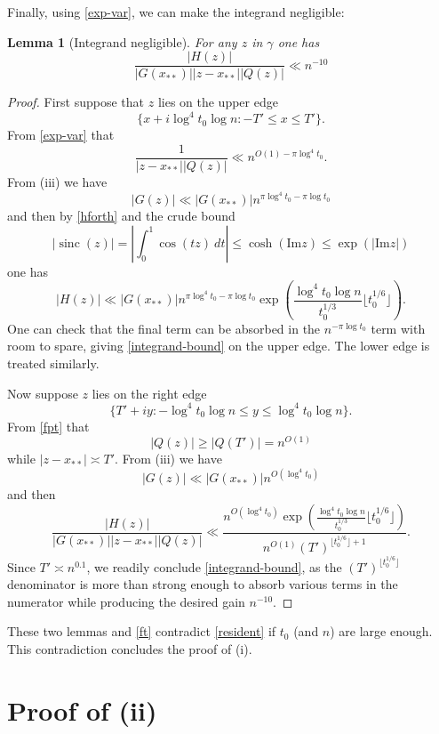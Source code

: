 \documentclass[12pt]{amsart}
\newtheorem{lemma}[theorem]{Lemma}
\newcommand{\sinc}{\operatorname{sinc}}
\begin{document}
Finally, using \eqref{exp-var}, we can make the integrand negligible:

\begin{lemma}[Integrand negligible]\label{integ-lemma}  For any $z$ in $\gamma$ one has
\begin{equation}\label{integrand-bound}
      \frac{|H(z)|}{|G(x_{**})| |z-x_{**}| |Q(z)|}
\ll n^{-10}
\end{equation}
\end{lemma}

\begin{proof}
First suppose that $z$ lies on the upper edge
$$ \{ x + i \log^4 t_0 \log n : -T' \leq x \leq T' \}.$$
From \eqref{exp-var} that
$$ \frac{1}{|z-x_{**}| |Q(z)|} \ll n^{O(1) - \pi \log^4 t_0}. $$
From (iii) we have
$$ |G(z)| \ll |G(x_{**})| n^{\pi \log^4 t_0 - \pi \log t_0}$$
and then by \eqref{hforth} and the crude bound
$$|\sinc(z)| = \left|\int_0^1 \cos(tz)\ dt\right| \leq \cosh(\mathrm{Im} z) \leq \exp(|\mathrm{Im} z|)$$
one has
$$ |H(z)| \ll |G(x_{**})| n^{\pi \log^4 t_0 - \pi \log t_0} \exp\left( \frac{\log^4 t_0 \log n}{t_0^{1/3}} \lfloor t_0^{1/6} \rfloor \right).$$
One can check that the final term can be absorbed in the $n^{-\pi \log t_0}$ term with room to spare, giving \eqref{integrand-bound} on the upper edge. The lower edge is treated similarly.

Now suppose $z$ lies on the right edge
$$ \{ T' + iy : -\log^4 t_0 \log n \leq y \leq \log^4 t_0 \log n \}.$$
From \eqref{fpt} that
$$ |Q(z)| \geq |Q(T')| = n^{O(1)}$$
while $|z-x_{**}| \asymp T'$.  From (iii) we have
$$ |G(z)| \ll |G(x_{**})|n^{O(\log^4 t_0)}$$
and then
$$      \frac{|H(z)|}{|G(x_{**})| |z-x_{**}| |Q(z)|}\ll \frac{n^{O(\log^4 t_0)} \exp\left( \frac{\log^4 t_0 \log n}{t_0^{1/3}} \lfloor t_0^{1/6} \rfloor \right)}{n^{O(1)} (T')^{\lfloor t_0^{1/6} \rfloor+1}}.$$
Since $T' \asymp n^{0.1}$, we readily conclude \eqref{integrand-bound}, as the $(T')^{\lfloor t_0^{1/6} \rfloor}$ denominator is more than strong enough to absorb various terms in the numerator while producing the desired gain $n^{-10}$.
\end{proof}

These two lemmas and \eqref{ft} contradict \eqref{resident} if $t_0$ (and $n$) are large enough.  This contradiction concludes the proof of (i).

\section{Proof of \texorpdfstring{}{Theorem~\ref{main}}(ii)}\label{integral-sec}
\end{document}
